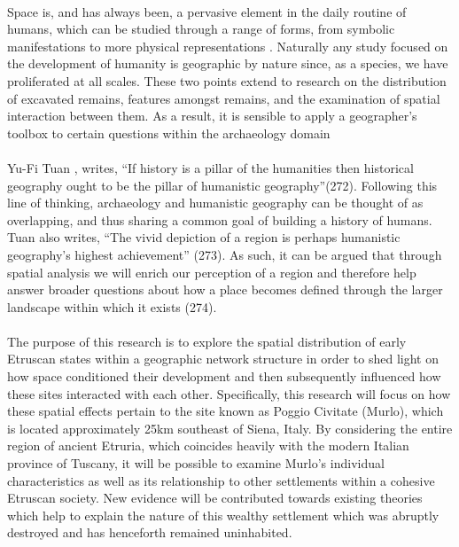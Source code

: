 \documentclass[12pt,a4paper]{thesis}
\begin{document}
\paragraph{}
Space is, and has always been, a pervasive  element in the daily routine of humans, which can be studied through a range of forms, from symbolic manifestations to more physical representations \cite[282]{Harvey06}. Naturally any study focused on the development of humanity is geographic by nature since, as a species, we have proliferated at all scales. These two points extend  to research on the distribution of excavated remains, features amongst remains, and the examination of spatial interaction between them. As a result, it is sensible to apply a geographer's toolbox to certain questions within the archaeology domain \cite[p. 39-42]{Kantner08}

\paragraph{}
Yu-Fi Tuan \citeyearpar{Tuan76}, writes, ``If history is a pillar of the humanities then historical geography ought to be the pillar of humanistic geography''(272). Following this line of thinking, archaeology and humanistic geography can be thought of as overlapping, and thus sharing a common goal of building a history of humans. Tuan also writes, ``The vivid depiction of a region is perhaps humanistic geography's highest achievement'' (273). As such, it can be argued that through spatial analysis we will enrich our perception of a region and therefore help answer broader questions about how a place becomes defined through the larger landscape within which it exists (274).

\paragraph{} 
The purpose of this research is to explore the spatial distribution of early Etruscan states within a geographic network structure in order to shed light on how space conditioned their development and then subsequently influenced how these sites interacted with each other. Specifically, this research will focus on how these spatial effects  pertain to the site known as Poggio Civitate (Murlo), which is located approximately 25km southeast of Siena, Italy. By considering the entire region of ancient Etruria, which coincides heavily with the modern Italian province of Tuscany, it will be possible to examine Murlo's individual characteristics as well as its relationship to other settlements within a cohesive Etruscan society. New evidence will be contributed towards existing theories which help to explain the nature of this wealthy settlement which was abruptly destroyed and has henceforth remained uninhabited.
\end{document}
